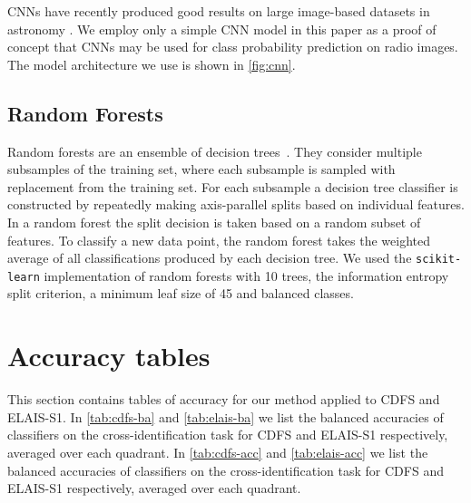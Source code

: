 \documentclass[fleqn,usenatbib,usedcolumn]{mnras}
\newcommand{\edited}[1]{#1}
\begin{document}
    CNNs have recently produced good results on large image-based datasets in
    astronomy \citep[e.g.]{lukic18compact, dieleman15cnn}. We employ
    only a simple CNN model in this paper as a proof of concept that CNNs may
    be used for class probability prediction on radio images. The model
    architecture we use is shown in \autoref{fig:cnn}.

  \subsection{Random Forests}
  \label{sec:random-forests}

    Random forests are an ensemble of decision
    trees~\citep{breiman01random-forest}. They consider multiple subsamples of
    the training set, where each subsample is sampled with replacement from
    the training set. For each subsample a decision tree classifier is
    constructed by repeatedly making axis-parallel splits based on individual
    features. In a random forest the split decision is taken based on a random
    subset of features. To classify a new data point, the random forest takes
    the weighted average of all classifications produced by each decision
    tree. \edited{We used the \texttt{scikit-learn} \citep{pedregosa11sklearn}
    implementation of random forests with 10 trees, the information entropy
    split criterion, a minimum leaf size of 45 and balanced classes}.

\section{Accuracy tables}\label{app:accuracies}
  
  This section contains tables of accuracy for our method applied to CDFS and
  ELAIS-S1. In \autoref{tab:cdfs-ba} and \autoref{tab:elais-ba} we list the
  balanced accuracies of classifiers on the cross-identification task for CDFS
  and ELAIS-S1 respectively, averaged over each quadrant. In
  \autoref{tab:cdfs-acc} and \autoref{tab:elais-acc} we list the balanced
  accuracies of classifiers on the cross-identification task for CDFS and
  ELAIS-S1 respectively, averaged over each quadrant.
\end{document}

